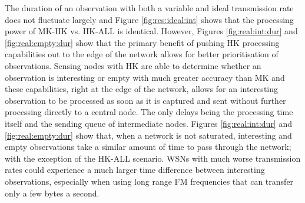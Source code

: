 The duration of an observation with both a variable and ideal transmission rate does not fluctuate largely and Figure \ref{fig:res:ideal:int} shows that the processing power of MK-HK vs. HK-ALL is identical. However, Figures \ref{fig:real:int:dur} and \ref{fig:real:empty:dur} show that the primary benefit of pushing HK processing capabilities out to the edge of the network allows for better prioritisation of observations. Sensing nodes with HK are able to determine whether an observation is interesting or empty with much greater accuracy than MK and these capabilities, right at the edge of the network, allows for an interesting observation to be processed as soon as it is captured and sent without further processing directly to a central node. The only delays being the processing time itself and the sending queue of intermediate nodes. Figures \ref{fig:real:int:dur} and \ref{fig:real:empty:dur} show that, when a network is not saturated, interesting and empty observations take a similar amount of time to pass through the network; with the exception of the HK-ALL scenario. WSNs with much worse transmission rates could experience a much larger time difference between interesting observations, especially when using long range FM frequencies that can transfer only a few bytes a second.
